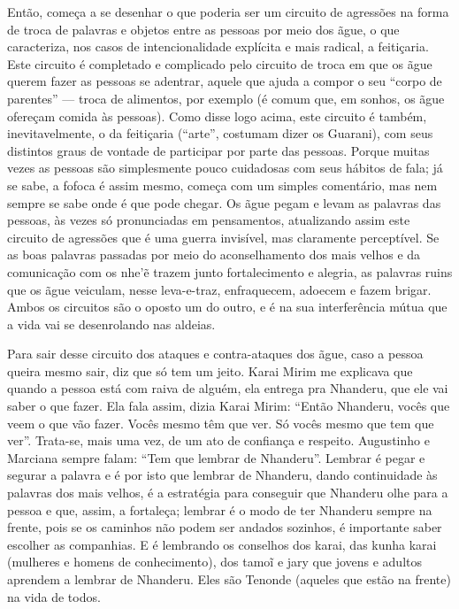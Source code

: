 Então, começa a se desenhar o que poderia ser um circuito de agressões
na forma de troca de palavras e objetos entre as pessoas por meio dos
ãgue, o que caracteriza, nos casos de intencionalidade explícita e mais
radical, a feitiçaria. Este circuito é completado e complicado pelo
circuito de troca em que os ãgue querem fazer as pessoas se adentrar,
aquele que ajuda a compor o seu ``corpo de parentes'' — troca de
alimentos, por exemplo (é comum que, em sonhos, os ãgue ofereçam comida
às pessoas). Como disse logo acima, este circuito é também,
inevitavelmente, o da feitiçaria (``arte'', costumam dizer os Guarani),
com seus distintos graus de vontade de participar por parte das
pessoas. Porque muitas vezes as pessoas são simplesmente pouco
cuidadosas com seus hábitos de fala; já se sabe, a fofoca é assim
mesmo, começa com um simples comentário, mas nem sempre se sabe onde é
que pode chegar.  Os ãgue pegam e levam as palavras das pessoas, às
vezes só pronunciadas em pensamentos, atualizando assim este circuito
de agressões que é uma guerra invisível, mas claramente perceptível. Se
as boas palavras passadas por meio do aconselhamento dos mais velhos e
da comunicação com os nhe’\~{e} trazem junto fortalecimento e
alegria, as palavras ruins que os ãgue veiculam, nesse leva-e-traz,
enfraquecem, adoecem e fazem brigar. Ambos os circuitos são o oposto um
do outro, e é na sua interferência mútua que a vida vai se desenrolando
nas aldeias. 

Para sair desse circuito dos ataques e contra-ataques dos ãgue, caso a
pessoa queira mesmo sair, diz que só tem um jeito. Karai Mirim me
explicava que quando a pessoa está com raiva de alguém, ela entrega pra
Nhanderu, que ele vai saber o que fazer. Ela fala assim, dizia Karai
Mirim: ``Então Nhanderu, vocês que veem o que vão fazer. Vocês mesmo têm
que ver. Só vocês mesmo que tem que ver''. Trata-se, mais uma vez, de um
ato de confiança e respeito. Augustinho e Marciana sempre falam: ``Tem
que lembrar de Nhanderu''. Lembrar é pegar e segurar a palavra e é por
isto que lembrar de Nhanderu, dando continuidade às palavras dos mais
velhos, é a estratégia para conseguir que Nhanderu olhe para a pessoa e
que, assim, a fortaleça; lembrar é o modo de ter Nhanderu sempre na
frente, pois se os caminhos não podem ser andados sozinhos, é
importante saber escolher as companhias. E é lembrando os conselhos dos
karai, das kunha karai (mulheres e homens de conhecimento), dos
tamo\~{i} e jary que jovens e adultos aprendem a lembrar de Nhanderu.
Eles são Tenonde (aqueles que estão na frente) na vida de todos.

